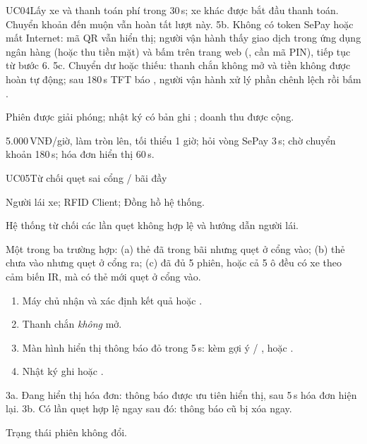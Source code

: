 \begin{usecase}{UC04}{Lấy xe và thanh toán phí}
      trong 30\,s; xe khác được bắt đầu thanh toán. Chuyển khoản đến muộn vẫn hoàn tất lượt này.
  5b. Không có token SePay hoặc mất Internet: mã QR vẫn hiển thị; người vận hành thấy giao
      dịch trong ứng dụng ngân hàng (hoặc thu tiền mặt) và bấm  trên trang web
      (, cần mã PIN), tiếp tục từ bước 6.
  5c. Chuyển dư hoặc thiếu: thanh chắn không mở và tiền không được hoàn tự động; sau 180\,s
      TFT báo , người vận hành xử lý phần chênh lệch rồi bấm .
\item[Hậu điều kiện] Phiên được giải phóng; nhật ký có bản ghi ; doanh thu được cộng.
\item[Thông số] 5.000\,VNĐ/giờ, làm tròn lên, tối thiểu 1 giờ; hỏi vòng SePay 3\,s; chờ
  chuyển khoản 180\,s; hóa đơn hiển thị 60\,s.
\end{usecase}

\begin{usecase}{UC05}{Từ chối quẹt sai cổng / bãi đầy}
\item[Tác nhân] Người lái xe; RFID Client; Đồng hồ hệ thống.
\item[Mô tả] Hệ thống từ chối các lần quẹt không hợp lệ và hướng dẫn người lái.
\item[Tiền điều kiện] Một trong ba trường hợp: (a) thẻ đã trong bãi nhưng quẹt ở cổng vào;
  (b) thẻ chưa vào nhưng quẹt ở cổng ra; (c) đã đủ 5 phiên, hoặc cả 5 ô đều có xe theo cảm biến IR, mà có thẻ mới quẹt ở cổng vào.
\item[Luồng chính] \begin{enumerate}[nosep,leftmargin=1.3em]
  \item Máy chủ nhận  và xác định kết quả  hoặc .
  \item Thanh chắn \emph{không} mở.
  \item Màn hình hiển thị thông báo đỏ trong 5\,s:  kèm gợi ý
         / ,
        hoặc .
  \item Nhật ký ghi  hoặc .
\end{enumerate}
\item[Ngoại lệ] 3a. Đang hiển thị hóa đơn: thông báo được ưu tiên hiển thị, sau 5\,s hóa đơn hiện lại.
  3b. Có lần quẹt hợp lệ ngay sau đó: thông báo cũ bị xóa ngay.
\item[Hậu điều kiện] Trạng thái phiên không đổi.
\end{usecase}

